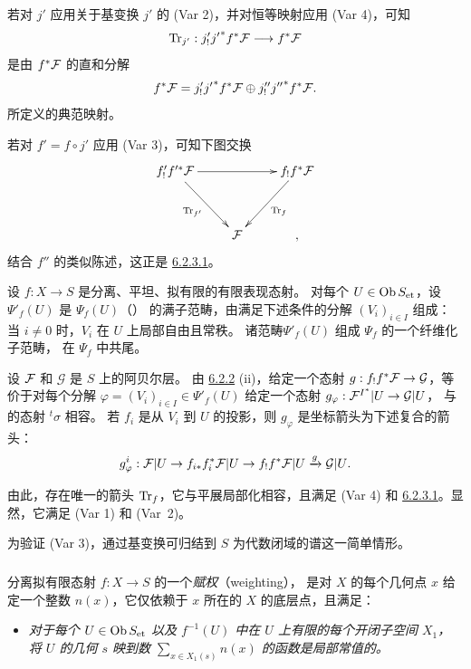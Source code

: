 若\pageoriginale 对 $j'$ 应用关于基变换 $j'$ 的 (Var 2)，并对恒等映射应用 (Var 4)，可知
$$
\operatorname{Tr}_{j'}:j'_{!}{j'}^{\ast}f^{\ast}{\mathcal F} \longrightarrow
f^{\ast}{\mathcal F}
$$
是由 $f^{\ast}{\mathcal F} $ 的直和分解
$$
f^{\ast}{\mathcal F} =j'_{!}{j'}^{\ast}f^{\ast}{\mathcal F} \oplus
j''_{!}{j''}^{\ast}f^{\ast}{\mathcal F} {}.
$$
所定义的典范映射。

若对 $f'=f\circ j'$ 应用 (Var 3)，可知下图交换
\[
\xymatrix@R=1.25cm{
f'_{!} f'^{\ast}\Ff  \ar[rr] \ar[rd]_{\Tr_{f'}}& &f_{!}f^{\ast}\Ff \ar[ld]^{\Tr_f}\\
                                   & \Ff    &    ,
}
\]
结合 $f''$ 的类似陈述，这正是 \hyperref[XVII.lem6.2.3.1]{6.2.3.1}。

设 $f:X\rightarrow S$ 是分离、平坦、拟有限的有限表现态射。
对每个 $U\in \operatorname{Ob} S_{\text{\rm et}}$，设 $\Psi'_{f}(U)$ 是
$\Psi_{f}(U)$（）
的满子范畴，由满足下述条件的分解 $(V_{i})_{i\in I}$ 组成：
当 $i\neq 0$ 时，$V_{i}$ 在 $U$ 上局部自由且常秩。
诸范畴\pageoriginale $\Psi'_{f}(U)$ 组成 $\Psi_{f}$ 的一个纤维化子范畴，
在 $\Psi_{f}$ 中共尾。

设 ${\mathcal F} $ 和 $\mathcal{G}$ 是 $S$ 上的阿贝尔层。
由 \hyperref[XVII.prop6.2.2]{6.2.2} (ii)，给定一个态射
$g:f_{!}f^{\ast}{\mathcal F} \rightarrow \mathcal{G}$，等价于对每个分解
$\varphi=(V_{i})_{i\in I}\in\Psi'_{f}(U)$ 给定一个态射
$g_{\varphi}:{\mathcal F} ^{I^{\ast}}|U\rightarrow \mathcal{G}|U$，
与  的态射 ${}^{t}\sigma$ 相容。
若 $f_{i}$ 是从 $V_{i}$ 到 $U$ 的投影，则 $g_{\varphi}$ 是坐标箭头为下述复合的箭头：
\[
g^{i}_{\varphi}:{\mathcal F} |U\rightarrow
f_{i\ast}f^{\ast}_{i}{\mathcal F} |U\rightarrow
f_{!}f^{\ast}{\mathcal F} |U\xrightarrow{g} \mathcal{G}|U{}.
\]

由此，存在唯一的箭头 $\operatorname{Tr}_{f}$，它与平展局部化相容，且满足 (Var 4) 和
\hyperref[XVII.lem6.2.3.1]{6.2.3.1}。显然，它满足 (Var 1) 和 (Var~2)。

为验证 (Var 3)，通过基变换可归结到 $S$ 为代数闭域的谱这一简单情形。

\setcounter{subsubsection}{3}
\subsubsection{}
分离拟有限态射 $f:X\rightarrow S$ 的一个\emph{赋权}（weighting），
是对 $X$ 的每个几何点 $x$ 给定一个整数 $n(x)$，它仅依赖于 $x$ 所在的 $X$ 的底层点，且满足：
\begin{itemize}
\item[$(\ast)$] \emph{对于每个 $U\in \operatorname{Ob} S_{\text{\rm et}}$ 以及
$f^{-1}(U)$ 中在 $U$ 上有限的每个开闭子空间 $X_{1}$，
将 $U$ 的几何 $s$ 映到数 $\sum_{x\in X_{1}(s)}n(x)$ 的函数是局部常值的。}
\end{itemize}

